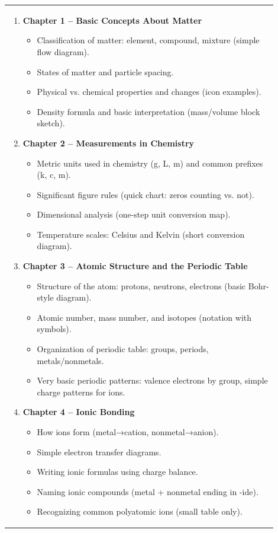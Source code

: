 \documentclass{article}
\begin{document}
\begin{tabular}{|p{0.9\linewidth}|}
\hline
\begin{enumerate}[label=\arabic*.]

    \item \textbf{Chapter 1 – Basic Concepts About Matter}
    \begin{itemize}
        \item Classification of matter: element, compound, mixture (simple flow diagram).
        \item States of matter and particle spacing.
        \item Physical vs. chemical properties and changes (icon examples).
        \item Density formula and basic interpretation (mass/volume block sketch).
    \end{itemize}

    \item \textbf{Chapter 2 – Measurements in Chemistry}
    \begin{itemize}
        \item Metric units used in chemistry (g, L, m) and common prefixes (k, c, m).
        \item Significant figure rules (quick chart: zeros counting vs. not).
        \item Dimensional analysis (one-step unit conversion map).
        \item Temperature scales: Celsius and Kelvin (short conversion diagram).
    \end{itemize}

    \item \textbf{Chapter 3 – Atomic Structure and the Periodic Table}
    \begin{itemize}
        \item Structure of the atom: protons, neutrons, electrons (basic Bohr-style diagram).
        \item Atomic number, mass number, and isotopes (notation with symbols).
        \item Organization of periodic table: groups, periods, metals/nonmetals.
        \item Very basic periodic patterns: valence electrons by group, simple charge patterns for ions.
    \end{itemize}

    \item \textbf{Chapter 4 – Ionic Bonding}
    \begin{itemize}
        \item How ions form (metal→cation, nonmetal→anion).
        \item Simple electron transfer diagrams.
        \item Writing ionic formulas using charge balance.
        \item Naming ionic compounds (metal + nonmetal ending in -ide).
        \item Recognizing common polyatomic ions (small table only).
    \end{itemize}


\end{enumerate}
\end{tabular}
\end{document}
